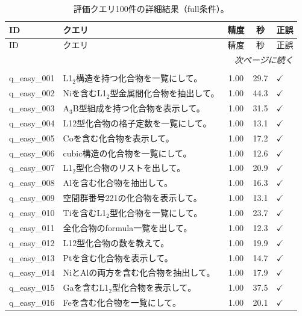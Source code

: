 \documentclass[5p,twocolumn]{elsarticle}
\begin{document}
\begin{longtable}{lp{8.5cm}ccl}
  \caption{評価クエリ100件の詳細結果（full条件）。}
  \label{tab:sup_query_detail} \\
  \toprule
  ID & クエリ & 精度 & 秒 & 正誤 \\
  \midrule
  \endfirsthead
  \toprule
  ID & クエリ & 精度 & 秒 & 正誤 \\
  \midrule
  \endhead
  \midrule
  \multicolumn{5}{r}{\textit{次ページに続く}} \\
  \endfoot
  \bottomrule
  \endlastfoot
    \midrule
    \multicolumn{5}{l}{\textbf{Easy（20件）}} \\
    \midrule
    q\_easy\_001 & L1$_2$構造を持つ化合物を一覧にして。 & 1.00 & 29.7 & $\checkmark$ \\
    q\_easy\_002 & Niを含むL1$_2$型金属間化合物を抽出して。 & 1.00 & 44.3 & $\checkmark$ \\
    q\_easy\_003 & A$_3$B型組成を持つ化合物を表示して。 & 1.00 & 31.5 & $\checkmark$ \\
    q\_easy\_004 & L12型化合物の格子定数を一覧にして。 & 1.00 & 13.1 & $\checkmark$ \\
    q\_easy\_005 & Coを含む化合物を表示して。 & 1.00 & 17.2 & $\checkmark$ \\
    q\_easy\_006 & cubic構造の化合物を一覧にして。 & 1.00 & 12.6 & $\checkmark$ \\
    q\_easy\_007 & L1$_2$型化合物のリストを出して。 & 1.00 & 20.9 & $\checkmark$ \\
    q\_easy\_008 & Alを含む化合物を抽出して。 & 1.00 & 16.3 & $\checkmark$ \\
    q\_easy\_009 & 空間群番号221の化合物を表示して。 & 1.00 & 13.1 & $\checkmark$ \\
    q\_easy\_010 & Tiを含むL1$_2$型化合物を一覧にして。 & 1.00 & 23.7 & $\checkmark$ \\
    q\_easy\_011 & 全化合物のformula一覧を出して。 & 1.00 & 12.3 & $\checkmark$ \\
    q\_easy\_012 & L12型化合物の数を教えて。 & 1.00 & 19.9 & $\checkmark$ \\
    q\_easy\_013 & Ptを含む化合物を表示して。 & 1.00 & 14.7 & $\checkmark$ \\
    q\_easy\_014 & NiとAlの両方を含む化合物を抽出して。 & 1.00 & 17.9 & $\checkmark$ \\
    q\_easy\_015 & Gaを含むL1$_2$型化合物を表示して。 & 1.00 & 37.5 & $\checkmark$ \\
    q\_easy\_016 & Feを含む化合物を一覧にして。 & 1.00 & 20.1 & $\checkmark$ \\

\end{longtable}
\end{document}
